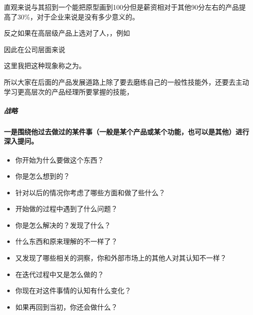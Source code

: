 \documentclass[letterpaper,11pt,english]{sphinxmanual}
\begin{document}
直观来说与其招到一个能把原型画到100分但是薪资相对于其他90分左右的产品提高了30\%，对于企业来说是没有多少意义的。

反之如果在高层级产品上选对了人，，例如

因此在公司层面来说

这里我把这种现象称之为。

所以大家在后面的产品发展道路上除了要去磨练自己的一般性技能外，还要去主动学习更高层次的产品经理所要掌握的技能，


\subparagraph{战略}
\label{\detokenize{chapter_interview/question:id9}}

\paragraph{一是围绕他过去做过的某件事（一般是某个产品或某个功能，也可以是其他）进行深入提问。}
\label{\detokenize{chapter_interview/question:id10}}\begin{itemize}
\item {} 
你开始为什么要做这个东西？

\item {} 
你是怎么想到的？

\item {} 
针对以后的情况你考虑了哪些方面和做了些什么？

\item {} 
开始做的过程中遇到了什么问题？

\item {} 
你是怎么解决的？发现了什么？

\item {} 
什么东西和原来理解的不一样了？

\item {} 
又发现了哪些相关的洞察，你和外部市场上的其他人对其认知不一样？

\item {} 
在迭代过程中又是怎么做的？

\item {} 
你现在对这件事情的认知有什么变化？

\item {} 
如果再回到当初，你还会做什么？

\end{itemize}
\end{document}
